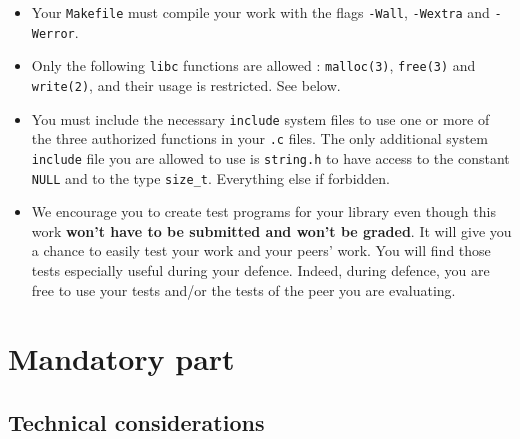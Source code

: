 \documentclass{42-en}
\begin{document}
\begin{itemize}
        \item Your \texttt{Makefile} must compile your work
          with the flags \texttt{-Wall}, \texttt{-Wextra} and
          \texttt{-Werror}.

        \newpage
        \item Only the following \texttt{libc} functions are allowed :
          \texttt{malloc(3)}, \texttt{free(3)} and \texttt{write(2)},
          and their usage is restricted. See below.

        \item You must include the necessary \texttt{include} system
          files to use one or more of the three authorized functions
          in your \texttt{.c} files. The only additional system
          \texttt{include} file you are allowed to use is
          \texttt{string.h} to have access to the constant
          \texttt{NULL} and to the type \texttt{size\_t}. Everything
          else if forbidden.

        \item We encourage you to create test programs for your
          library even though this work \textbf{won't have to be
            submitted and won't be graded}. It will give you a chance
          to easily test your work and your peers’ work. You will find
          those tests especially useful during your defence. Indeed,
          during defence, you are free to use your tests and/or the
          tests of the peer you are evaluating.

    \end{itemize}



\chapter{Mandatory part}

    \section{Technical considerations}
\end{document}
